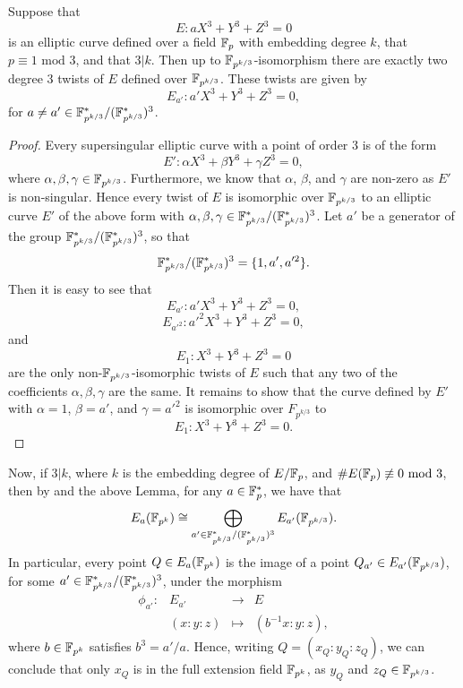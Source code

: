 \begin{lemma}
Suppose that
\[E: aX^{3} + Y^{3} + Z^{3} = 0\] is an elliptic curve defined over a field $\mathbb{F}_{p}$ with embedding degree $k$, that $p \equiv 1 \text{ mod } 3$, and that $3|k$. Then up to $\mathbb{F}_{p^{k/3}}$-isomorphism there are exactly two degree 3 twists of $E$ defined over $\mathbb{F}_{p^{k/3}}$. These twists are given by
\[E_{a'}: a'X^{3} + Y^{3} + Z^{3} = 0,\] for $a \neq a' \in \mathbb{F}_{p^{k/3}}^{*}/(\mathbb{F}_{p^{k/3}}^{*})^{3}$.
\end{lemma}

\begin{proof}
Every supersingular elliptic curve with a point of order 3 is of the form
\[E': \alpha X^{3} + \beta Y^{3} + \gamma Z^{3} = 0,\] where $\alpha,\beta,\gamma \in \mathbb{F}_{p^{k/3}}$. Furthermore, we know that $\alpha$, $\beta$, and $\gamma$ are non-zero as $E'$ is non-singular. Hence every twist of $E$ is isomorphic over $\mathbb{F}_{p^{k/3}}$ to an elliptic curve $E'$ of the above form with $\alpha,\beta,\gamma \in \mathbb{F}_{p^{k/3}}^{*}/(\mathbb{F}_{p^{k/3}}^{*})^{3}$. Let $a'$ be a generator of the group $\mathbb{F}_{p^{k/3}}^{*}/(\mathbb{F}_{p^{k/3}}^{*})^{3}$, so that
\[\mathbb{F}_{p^{k/3}}^{*}/(\mathbb{F}_{p^{k/3}}^{*})^{3} = \{1,a',a'^{2}\}.\] Then it is easy to see that
\[ E_{a'} : a'X^{3} + Y^{3} + Z^{3} = 0,\] \[E_{a'^{2}} : a'^{2}X^{3} + Y^{3} + Z^{3} = 0,\] and\[ E_{1}: X^{3} + Y^{3} + Z^{3} = 0\] are the only non-$\mathbb{F}_{p^{k/3}}$-isomorphic twists of $E$ such that any two of the coefficients $\alpha,\beta,\gamma$ are the same. It remains to show that the curve defined by $E'$ with $\alpha = 1$, $\beta = a'$, and $\gamma = a'^{2}$ is isomorphic over $F_{p^{k/3}}$ to \[E_{1}: X^{3} + Y^{3} + Z^{3} = 0.\]
\end{proof}

Now, if $3|k$, where $k$ is the embedding degree of $E/\mathbb{F}_{p}$, and $\#E(\mathbb{F}_{p}) \not\equiv 0 \text{ mod } 3$, then by \cite[Theorem 3]{Hess, Smart, Vercauteren} and the above Lemma, for any $a \in \mathbb{F}_{p}^{*}$, we have that
\[E_{a}(\mathbb{F}_{p^{k}}) \cong \bigoplus_{a' \in \mathbb{F}_{p^{k/3}}^{*}/(\mathbb{F}_{p^{k/3}}^{*})^{3}} E_{a'}(\mathbb{F}_{p^{k/3}}).\] 
In particular, every point $Q \in E_{a}(\mathbb{F}_{p^{k}})$ is the image of a point $Q_{a'} \in E_{a'}(\mathbb{F}_{p^{k/3}})$, for some $a' \in \mathbb{F}_{p^{k/3}}^{*}/(\mathbb{F}_{p^{k/3}}^{*})^{3}$, under the morphism
\[\begin{array}{rccc}
\phi_{a'}:& E_{a'} & \longrightarrow & E \\
& (x:y:z) & \mapsto & (b^{-1}x:y:z),
\end{array}\]
where $b \in \mathbb{F}_{p^{k}}$ satisfies $b^{3} = a'/a$. Hence, writing $Q = (x_{Q}:y_{Q}:z_{Q})$, we can conclude that only $x_{Q}$ is in the full extension field $\mathbb{F}_{p^{k}}$, as $y_{Q}$ and $z_{Q} \in \mathbb{F}_{p^{k/3}}$. 
\\

